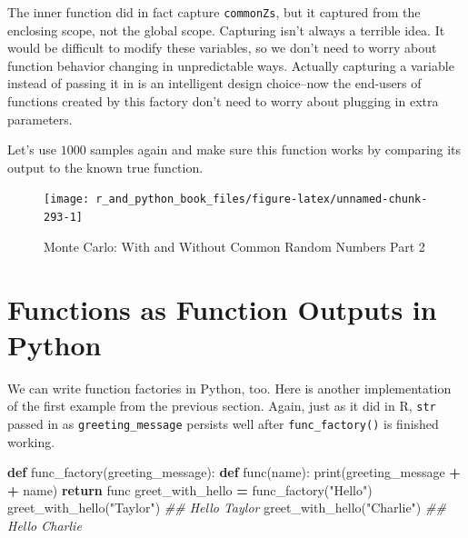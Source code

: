 \documentclass[
  12pt,
  krantz2]{krantz}
\makeatletter
\newenvironment{Shaded}{\begin{snugshade}}{\end{snugshade}}
\newcommand{\BuiltInTok}[1]{#1}
\newcommand{\CommentTok}[1]{\textcolor[rgb]{0.37,0.37,0.37}{\textit{#1}}}
\newcommand{\ControlFlowTok}[1]{\textcolor[rgb]{0.27,0.27,0.27}{\textbf{#1}}}
\newcommand{\KeywordTok}[1]{\textcolor[rgb]{0.27,0.27,0.27}{\textbf{#1}}}
\newcommand{\NormalTok}[1]{#1}
\newcommand{\OperatorTok}[1]{\textcolor[rgb]{0.43,0.43,0.43}{\textbf{#1}}}
\newcommand{\StringTok}[1]{\textcolor[rgb]{0.5,0.5,0.5}{#1}}
\newenvironment{kframe}{%
\medskip{}
\setlength{\fboxsep}{.8em}
 \def\at@end@of@kframe{}%
 \ifinner\ifhmode%
  \def\at@end@of@kframe{\end{minipage}}%
  \begin{minipage}{\columnwidth}%
 \fi\fi%
 \def\FrameCommand##1{\hskip\@totalleftmargin \hskip-\fboxsep
 \colorbox{shadecolor}{##1}\hskip-\fboxsep
     \hskip-\linewidth \hskip-\@totalleftmargin \hskip\columnwidth}%
 \MakeFramed {\advance\hsize-\width
   \@totalleftmargin\z@ \linewidth\hsize
   \@setminipage}}%
 {\par\unskip\endMakeFramed%
 \at@end@of@kframe}
\renewenvironment{Shaded}{\begin{kframe}}{\end{kframe}}
\makeatother
\begin{document}
The inner function did in fact capture \texttt{commonZs}, but it captured from the enclosing scope, not the global scope. Capturing isn't always a terrible idea. It would be difficult to modify these variables, so we don't need to worry about function behavior changing in unpredictable ways. Actually capturing a variable instead of passing it in is an intelligent design choice--now the end-users of functions created by this factory don't need to worry about plugging in extra parameters.

Let's use \(1000\) samples again and make sure this function works by comparing its output to the known true function.

\begin{figure}

{\centering \texttt{[image: r\_and\_python\_book\_files/figure-latex/unnamed-chunk-293-1]} 

}

\caption{Monte Carlo: With and Without Common Random Numbers Part 2}\label{fig:unnamed-chunk-293}
\end{figure}

\hypertarget{functions-as-function-outputs-in-python}{%
\section{Functions as Function Outputs in Python}\label{functions-as-function-outputs-in-python}}

We can write function factories in Python, too. Here is another implementation of the first example from the previous section. Again, just as it did in R, \texttt{str} passed in as \texttt{greeting\_message} persists well after \texttt{func\_factory()} is finished working.

\begin{Shaded}
\begin{Highlighting}[]
\KeywordTok{def}\NormalTok{ func\_factory(greeting\_message):}
  \KeywordTok{def}\NormalTok{ func(name):}
    \BuiltInTok{print}\NormalTok{(greeting\_message }\OperatorTok{+} \StringTok{\textquotesingle{} \textquotesingle{}} \OperatorTok{+}\NormalTok{ name)}
  \ControlFlowTok{return}\NormalTok{ func}
\NormalTok{greet\_with\_hello }\OperatorTok{=}\NormalTok{ func\_factory(}\StringTok{"Hello"}\NormalTok{)}
\NormalTok{greet\_with\_hello(}\StringTok{"Taylor"}\NormalTok{)}
\CommentTok{\#\# Hello Taylor}
\NormalTok{greet\_with\_hello(}\StringTok{"Charlie"}\NormalTok{)}
\CommentTok{\#\# Hello Charlie}
\end{Highlighting}
\end{Shaded}
\end{document}
